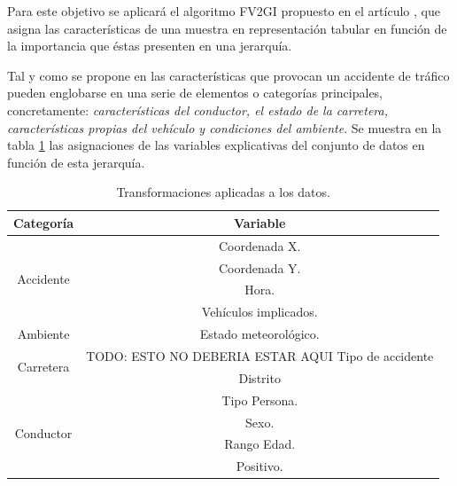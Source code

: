         Para este objetivo se aplicará el algoritmo FV2GI propuesto en el artículo \cite{TASPCNN}, que asigna las características de una muestra en representación tabular en función de la importancia que éstas presenten en una jerarquía.

        Tal y como se propone en \cite{JerarquiaImagenes} las características que provocan un accidente de tráfico pueden englobarse en una serie de elementos o categorías principales, concretamente: \textit{características del conductor, el estado de la carretera, características propias del vehículo y condiciones del ambiente}. Se muestra en la tabla \ref{JerarquiaCaracteristicasTabla} las asignaciones de las variables explicativas del conjunto de datos en función de esta jerarquía.


        \begin{table}[H]
          \centering
          \begin{tabular}{ |c|c| }
               \hline
               \textbf{Categoría} & \textbf{Variable}\\

               \hline
               \multirow{4}{*}{Accidente}            & Coordenada X.\\
                                                     & Coordenada Y.\\
                                                     & Hora.\\
                                                     & Vehículos implicados.\\

               \hline
               \multirow{1}{*}{Ambiente}             & Estado meteorológico.\\

               \hline
               \multirow{2}{*}{Carretera}            & TODO: ESTO NO DEBERIA ESTAR AQUI Tipo de accidente\\
                                                     & Distrito\\

               \hline
               \multirow{4}{*}{Conductor}            & Tipo Persona.\\
                                                     & Sexo.\\
                                                     & Rango Edad.\\
                                                     & Positivo.\\

               \hline
          \end{tabular}
          \caption{Transformaciones aplicadas a los datos.}
          \label{JerarquiaCaracteristicasTabla}
        \end{table}



